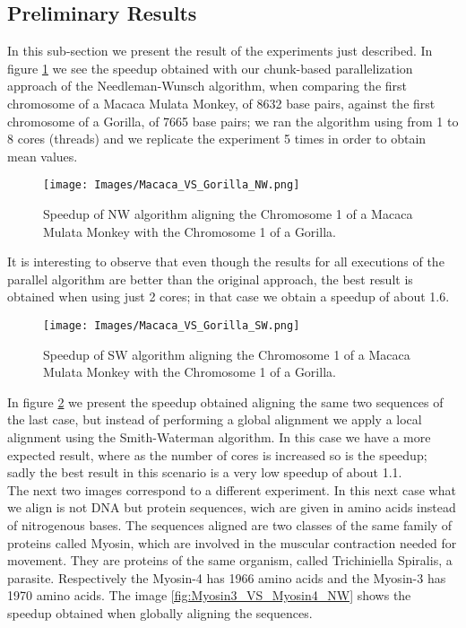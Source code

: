 \documentclass[journal]{IEEEtran}
\begin{document}
\subsection{Preliminary Results}

In this sub-section we present the result of the experiments just described. In figure \ref{fig:Macaca_VS_Gorilla_NW} we see the speedup obtained with our chunk-based parallelization approach of the Needleman-Wunsch algorithm, when comparing the first chromosome of a Macaca Mulata Monkey, of 8632 base pairs, against the first chromosome of a Gorilla, of 7665 base pairs; we ran the algorithm using from 1 to 8 cores (threads) and we replicate the experiment 5 times in order to obtain mean values. 

\begin{figure}[h]
  \begin{center}
    \texttt{[image: Images/Macaca\_VS\_Gorilla\_NW.png]}
  \end{center}
  \caption{Speedup of NW algorithm aligning the Chromosome 1 of a Macaca Mulata Monkey with the Chromosome 1 of a Gorilla.}
  \label{fig:Macaca_VS_Gorilla_NW}
\end{figure}

It is interesting to observe that even though the results for all executions of the parallel algorithm are better than the original approach, the best result is obtained when using just 2 cores; in that case we obtain a speedup of about 1.6.    

\begin{figure}[h]
  \begin{center}
    \texttt{[image: Images/Macaca\_VS\_Gorilla\_SW.png]}
  \end{center}
  \caption{Speedup of SW algorithm aligning the Chromosome 1 of a Macaca Mulata Monkey with the Chromosome 1 of a Gorilla.}
  \label{fig:Macaca_VS_Gorilla_SW}
\end{figure}

In figure \ref{fig:Macaca_VS_Gorilla_SW} we present the speedup obtained aligning the same two sequences of the last case, but instead of performing a global alignment we apply a local alignment using the Smith-Waterman algorithm. In this case we have a more expected result, where as the number of cores is increased so is the speedup; sadly the best result in this scenario is a very low speedup of about 1.1. \\

The next two images correspond to a different experiment. In this next case what we align is not DNA but protein sequences, wich are given in amino acids instead of nitrogenous bases. The sequences aligned are two classes of the same family of proteins called Myosin, which are involved in the muscular contraction needed for movement. They are proteins of the same organism, called Trichiniella Spiralis, a parasite. Respectively the Myosin-4 has 1966 amino acids and the Myosin-3 has 1970 amino acids. The image \ref{fig:Myosin3_VS_Myosin4_NW} shows the speedup obtained when globally aligning the sequences. 
\end{document}

